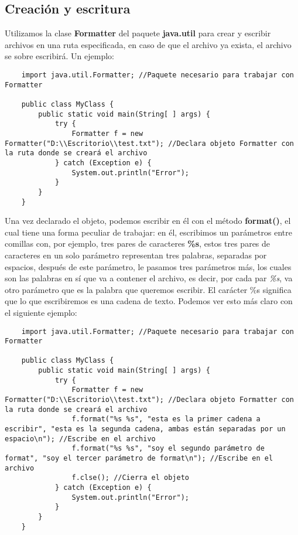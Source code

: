 \subsection{Creación y escritura}
\hspace{0.55cm}Utilizamos la clase \textbf{Formatter} del paquete \textbf{java.util} para crear y escribir archivos en una ruta especificada, en caso de que el archivo ya exista, el archivo se sobre escribirá. Un ejemplo:
\begin{lstlisting}
    import java.util.Formatter; //Paquete necesario para trabajar con Formatter

    public class MyClass {
        public static void main(String[ ] args) {
            try {
                Formatter f = new Formatter("D:\\Escritorio\\test.txt"); //Declara objeto Formatter con la ruta donde se creará el archivo
            } catch (Exception e) {
                System.out.println("Error");
            }
        }
    }
\end{lstlisting}

Una vez declarado el objeto, podemos escribir en él con el método \textbf{format()}, el cual tiene una forma peculiar de trabajar: en él, escribimos un parámetros entre comillas con, por ejemplo, tres pares de caracteres \textbf{\%s}, estos tres pares de caracteres en un solo parámetro representan tres palabras, separadas por espacios, después de este parámetro, le pasamos tres parámetros más, los cuales son las palabras en sí que va a contener el archivo, es decir, por cada par \textit{\%s}, va otro parámetro que es la palabra que queremos escribir. El carácter \%s significa que lo que escribiremos es una cadena de texto. Podemos ver esto más claro con el siguiente ejemplo:
\begin{lstlisting}
    import java.util.Formatter; //Paquete necesario para trabajar con Formatter

    public class MyClass {
        public static void main(String[ ] args) {
            try {
                Formatter f = new Formatter("D:\\Escritorio\\test.txt"); //Declara objeto Formatter con la ruta donde se creará el archivo
                f.format("%s %s", "esta es la primer cadena a escribir", "esta es la segunda cadena, ambas están separadas por un espacio\n"); //Escribe en el archivo
                f.format("%s %s", "soy el segundo parámetro de format", "soy el tercer parámetro de format\n"); //Escribe en el archivo
                f.clse(); //Cierra el objeto
            } catch (Exception e) {
                System.out.println("Error");
            }
        }
    }
\end{lstlisting}